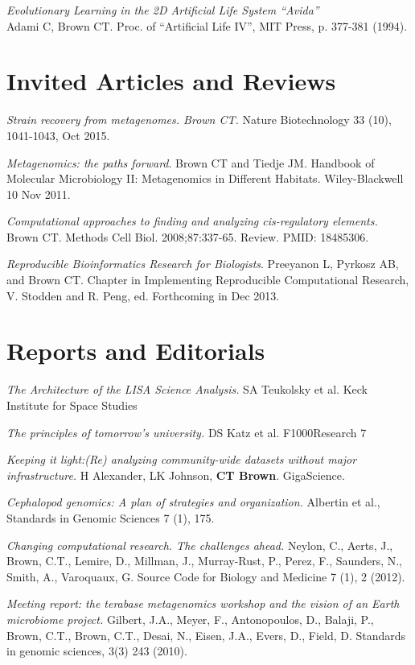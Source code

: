 \documentclass[margin,line]{resume}
\begin{document}
\begin{resume}
{\em Evolutionary Learning in the 2D Artificial Life System ``Avida''}\\
Adami C, Brown CT. Proc. of ``Artificial Life IV'', MIT Press, p. 377-381
(1994).

\section{\mysidestyle Invited Articles and Reviews}

{\em Strain recovery from metagenomes. Brown CT.} Nature Biotechnology
33 (10), 1041-1043, Oct 2015.

{\em Metagenomics: the paths forward}.  Brown CT and Tiedje JM.
Handbook of Molecular Microbiology II: Metagenomics in Different
Habitats.  Wiley-Blackwell 10 Nov 2011.

{\em Computational approaches to finding and analyzing cis-regulatory elements.} 
Brown CT. Methods Cell Biol. 2008;87:337-65. Review.
PMID: 18485306.

{\em Reproducible Bioinformatics Research for Biologists}.  Preeyanon
L, Pyrkosz AB, and Brown CT. Chapter in Implementing Reproducible
Computational Research, V. Stodden and R. Peng, ed.  Forthcoming in
Dec 2013.

\section{\mysidestyle Reports and Editorials}

{\em The Architecture of the LISA Science Analysis.} SA Teukolsky et al.
Keck Institute for Space Studies

{\em The principles of tomorrow's university.} DS Katz et al. F1000Research 7

{\em Keeping it light:(Re) analyzing community-wide datasets without major infrastructure.} H Alexander, LK Johnson, {\bf CT Brown}.
GigaScience.

{\em Cephalopod genomics: A plan of strategies and organization.} Albertin et al., Standards in Genomic Sciences 7 (1), 175.

{\em Changing computational research. The challenges ahead.}
Neylon, C., Aerts, J., Brown, C.T., Lemire, D., Millman, J., Murray-Rust, P., Perez, F., Saunders, N., Smith, A., Varoquaux, G.
Source Code for Biology and Medicine 7 (1), 2 (2012).

{\em Meeting report: the terabase metagenomics workshop and the vision of an Earth microbiome project.}
Gilbert, J.A., Meyer, F., Antonopoulos, D., Balaji, P., Brown, C.T., Brown, C.T., Desai, N., Eisen, J.A., Evers, D., Field, D. Standards in genomic sciences, 3(3) 243 (2010).


\end{resume}
\end{document}

